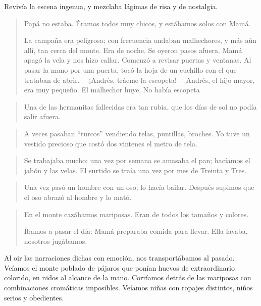 \documentclass[a4paper]{article}
\begin{document}
Revivía la escena ingenua, y mezclaba lágimas de risa y de nostalgia.

\begin{quote}
    Papá no estaba. Éramos todos muy chicos, y estábamos solos con Mamá.

    La campaña era peligrosa; con frecuencia andaban malhechores, y más aún allí, tan cerca del monte. Era de noche. Se oyeron pasos afuera. Mamá apagó la vela y nos hizo callar. Comenzó a revisar puertas y ventanas. Al pasar la mano por una puerta, tocó la hoja de un cuchillo con el que trataban de abrir. ---¡Andrés, tráeme la escopeta!--- Andrés, el hijo mayor, era muy pequeño. El malhechor huye. No había escopeta
\end{quote}

\begin{quote}
    Una de las hermanitas fallecidas era tan rubia, que los días de sol no podía salir afuera.
\end{quote}

\begin{quote}
    A veces pasaban ``turcos'' vendiendo telas, puntillas, broches. Yo tuve un vestido precioso que costó dos vintenes el metro de tela.
\end{quote}

\begin{quote}
    Se trabajaba mucho: una vez por semana se amasaba el pan; ha\-cí\-amos el jabón y las velas. El surtido se traía una vez por mes de Treinta y Tres.
\end{quote}

\begin{quote}
    Una vez pasó un hombre con un oso; lo hacía bailar. Después supimos que el oso abrazó al hombre y lo mató.
\end{quote}

\begin{quote}
    En el monte cazábamos mariposas. Eran de todos los tamaños y colores.

    Íbamos a pasar el día: Mamá preparaba comida para llevar. Ella lavaba, nosotros jugábamos.
\end{quote}

Al oir las narraciones dichas con emoción, nos transportábamos al pasado. Veíamos el monte poblado de pájaros que ponían huevos de extraordinario colorido, en nidos al alcance de la mano. Corríamos detrás de las mariposas con combinaciones cromáticas imposibles. Veíamos niñas con ropajes distintos, niños serios y obedientes.
\end{document}
